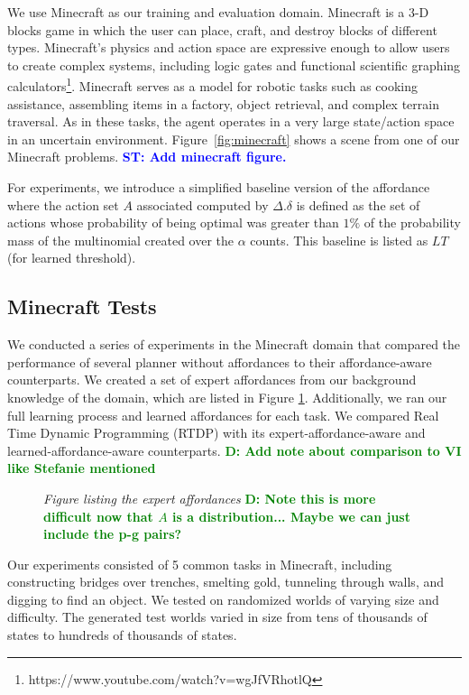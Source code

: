 \documentclass[conference]{IEEEtran}
\newcommand{\stnote}[1]{\textcolor{Blue}{\textbf{ST: #1}}}
\newcommand{\dnote}[1]{\textcolor{Green}{\textbf{D: #1}}}
\begin{document}
We use Minecraft as our training and evaluation domain. Minecraft is a
3-D blocks game in which the user can place, craft, and destroy blocks
of different types.  Minecraft's physics and action space are
expressive enough to allow users to create complex systems, including
logic gates and functional scientific graphing
calculators\footnote{https://www.youtube.com/watch?v=wgJfVRhotlQ}.
Minecraft serves as a model for robotic tasks such as cooking
assistance, assembling items in a factory, object retrieval, and
complex terrain traversal.  As in these tasks, the agent operates in a
very large state/action space in an uncertain environment.
Figure~\ref{fig:minecraft} shows a scene from one of our Minecraft
problems. \stnote{Add minecraft figure.}

For experiments, we introduce a simplified baseline version of the affordance where
the action set $A$ associated computed by $\Delta.\delta$ is defined
as the set of actions whose probability of being optimal was greater than $1\%$
of the probability mass of the multinomial created over the $\alpha$ counts. This
baseline is listed as $LT$ (for learned threshold).

\subsection{Minecraft Tests}
We conducted a series of experiments in the Minecraft domain that
compared the performance of several planner without affordances
to their affordance-aware counterparts. We created a set of expert
affordances from our background knowledge of the domain, which are
listed in Figure \ref{fig:afford_kb_exp}. Additionally, we ran our full
learning process and learned affordances for each task. We compared
Real Time Dynamic Programming (RTDP) with its expert-affordance-aware
and learned-affordance-aware counterparts. \dnote{Add note about
comparison to VI like Stefanie mentioned}

\begin{figure}
{\it Figure listing the expert affordances}
\dnote{Note this is more difficult now that $A$ is a distribution... Maybe we can just include the p-g pairs?}
\label{fig:afford_kb_exp}
\end{figure}

Our experiments consisted of 5 common tasks in Minecraft, including
constructing bridges over trenches, smelting gold, tunneling
through walls, and digging to find an object.  We tested on 
randomized worlds of varying size and difficulty. The generated test
worlds varied in size from tens of thousands of states to hundreds of thousands of states.
\end{document}
